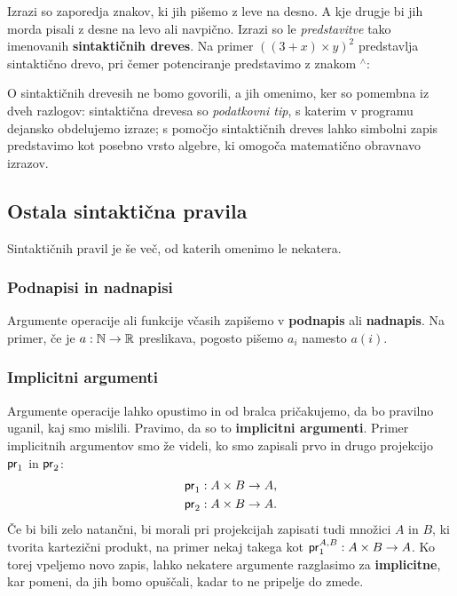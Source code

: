 Izrazi so zaporedja znakov, ki jih pišemo z leve na desno. A kje drugje bi jih morda pisali z desne na levo ali
navpično. Izrazi so le \emph{predstavitve} tako imenovanih \textbf{sintaktičnih dreves}. Na primer $((3 + x) \times y)^2$ predstavlja sintaktično drevo, pri čemer potenciranje predstavimo z znakom ${}^{\wedge}$:
%
\begin{center}
\end{center}
%
O sintaktičnih drevesih ne bomo govorili, a jih omenimo, ker so pomembna iz dveh razlogov: sintaktična drevesa so
\emph{podatkovni tip}, s katerim v programu dejansko obdelujemo izraze; s pomočjo sintaktičnih dreves lahko simbolni zapis
predstavimo kot posebno vrsto algebre, ki omogoča matematično obravnavo izrazov.


\subsection{Ostala sintaktična pravila}

Sintaktičnih pravil je še več, od katerih omenimo le nekatera.

\subsubsection{Podnapisi in nadnapisi}
\label{sec:podnapisi-nadnapisi}

Argumente operacije ali funkcije včasih zapišemo v \textbf{podnapis} ali \textbf{nadnapis}. Na primer, če je $a : \mathbb{N} \to \mathbb{R}$
preslikava, pogosto pišemo $a_i$ namesto $a(i)$.

\subsubsection{Implicitni argumenti}
\label{sec:implicitni-argumenti}

Argumente operacije lahko opustimo in od bralca pričakujemo, da bo pravilno uganil, kaj smo mislili. Pravimo, da so to
\textbf{implicitni argumenti}. Primer implicitnih argumentov smo že videli, ko smo zapisali prvo in drugo projekcijo $\mathsf{pr}_1$ in
$\mathsf{pr}_2$:
\begin{align*}
  \mathsf{pr}_1 &: A \times B \to A, \\
  \mathsf{pr}_2 &: A \times B \to A.
\end{align*}
%
Če bi bili zelo natančni, bi morali pri projekcijah zapisati tudi množici $A$ in $B$, ki tvorita kartezični produkt, na
primer nekaj takega kot $\mathsf{pr}_1^{A,B} : A \times B \to A$.
%
Ko torej vpeljemo novo zapis, lahko nekatere argumente razglasimo za \textbf{implicitne}, kar pomeni, da jih bomo opuščali,
kadar to ne pripelje do zmede.

